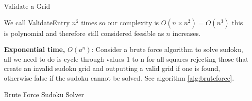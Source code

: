 \documentclass[a4paper,11pt]{report}
\begin{document}
\begin{algorithm}
\caption{Validate a Grid}\label{alg:valid}
\begin{algorithmic}
	 
			\EndIf
		\EndFor
	\EndFor
\EndProcedure
\end{algorithmic}
\end{algorithm}

We call ValidateEntry $n^2$ times so our complexity is $O(n\times n^2) = O(n^3)$ this is polynomial and therefore still considered feesible as $n$ increases. 
 
\textbf{Exponential time, $O(a^n)$}: Consider a brute force algorithm to solve sudoku, all we need to do is cycle through values 1 to n for all squares rejecting those that create an invalid sudoku grid and outputting a valid grid if one is found, otherwise false if the sudoku cannot be solved. See algorithm \ref{alg:bruteforce}.

\begin{algorithm}
\caption{Brute Force Sudoku Solver} \label{alg:bruteforce}
\begin{algorithmic}
		\Else
		\EndIf
	\EndIf
		\EndIf
	\EndFor
\EndProcedure
\end{algorithmic}
\end{algorithm}
\end{document}
